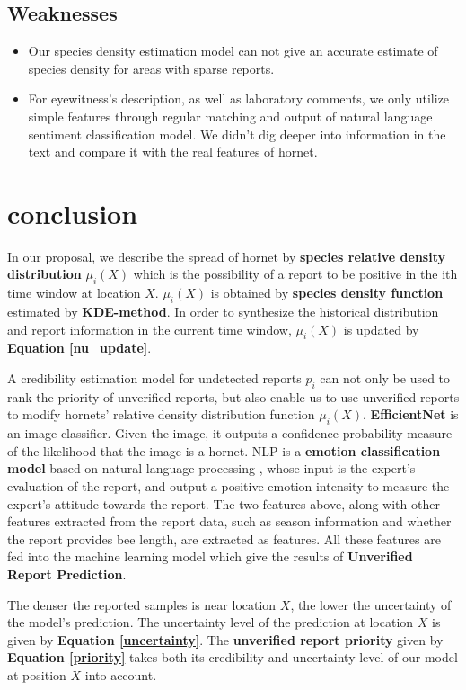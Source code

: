 \documentclass[12pt]{article}
\begin{document}
\subsection{Weaknesses}
\begin{itemize}
	\item Our species density estimation model can not give an accurate estimate of species density for areas with sparse reports.
	\item For eyewitness's description, as well as laboratory comments, we only utilize simple features through regular matching and output  of natural language sentiment classification model. We didn't dig deeper into information in the text and compare it with the real features of hornet.
\end{itemize}

\section{conclusion}
In our proposal, we describe the spread of hornet by \textbf{species relative density distribution} $\mu_i(X)$ which is the possibility of a report to be positive in the ith time window at location $X$. $\mu_i(X)$ is obtained by \textbf{species density function} estimated by \textbf{KDE-method}. In order to synthesize the historical distribution and report information in the current time window, $\mu_i(X)$ is updated by \textbf{Equation \ref{nu_update}}.

A credibility estimation model for undetected reports $p_i$ can not only be used to rank the priority of unverified reports, but also enable us to use  unverified reports to modify hornets' relative density distribution function $\mu_i(X)$. \textbf{EfficientNet} is an image classifier. Given the image, it outputs a confidence probability measure of the likelihood that the image is a hornet. NLP is a \textbf{emotion classification model} based on natural language processing , whose input is the expert's evaluation of the report, and output a positive emotion intensity to measure the expert's attitude towards the report. The two features above, along with other features extracted from the report data, such as season information and whether the report provides bee length, are extracted as features. All these features are fed into the machine learning model which give the results of \textbf{Unverified Report Prediction}. 

The denser the reported samples is near location $X$, the lower the uncertainty of the model's prediction. The uncertainty level of the prediction at location $X$ is given by \textbf{Equation \ref{uncertainty}}. The \textbf{unverified report priority} given by \textbf{Equation \ref{priority}} takes both its credibility and uncertainty level of our model at position $X$ into account.
\end{document}
